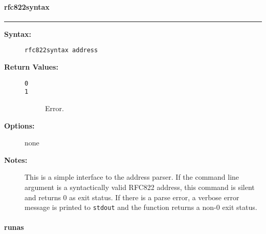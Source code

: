 \vspace {2pt}


\paragraph{rfc822syntax}

\hrule
\begin{description}
\item[{\bf Syntax:}] \mbox{}

{\tt rfc822syntax address}

\item[{\bf Return Values:}] \mbox{}

\begin{description}
\item[{\tt 0}] \mbox{}



\item[{\tt 1}] \mbox{}

Error.

\end{description}


\item[{\bf Options:}] \mbox{}

none  

\item[{\bf Notes:}] \mbox{}

This is a simple interface to the address 
parser. If the command line argument is a syntactically valid 
RFC822 address, this command is silent and returns 0 as exit 
status. If there is a parse error, a verbose error message is 
printed to {\tt stdout} and the function returns a non-0 
exit status. 

\end{description}


\vspace {2pt}


\paragraph{runas}

